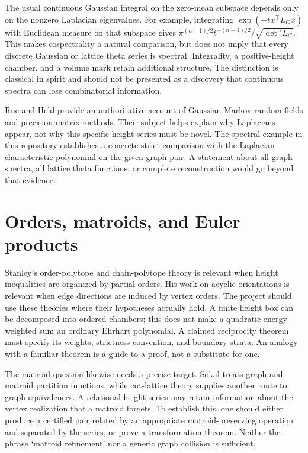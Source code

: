 \documentclass[
  11pt,
  a4paper,
]{report}
\begin{document}
The usual continuous Gaussian integral on the zero-mean subspace depends
only on the nonzero Laplacian eigenvalues. For example, integrating
\(\exp(-t x^\top L_Gx)\) with Euclidean measure on that subspace gives
\(\pi^{(n-1)/2}t^{-(n-1)/2}/\sqrt{\det' L_G}\). This makes cospectrality
a natural comparison, but does not imply that every discrete Gaussian or
lattice theta series is spectral. Integrality, a positive-height
chamber, and a volume mark retain additional structure. The distinction
is classical in spirit and should not be presented as a discovery that
continuous spectra can lose combinatorial information.

Rue and Held provide an authoritative account of Gaussian Markov random
fields and precision-matrix methods. Their subject helps explain why
Laplacians appear, not why this specific height series must be novel.
The spectral example in this repository establishes a concrete strict
comparison with the Laplacian characteristic polynomial on the given
graph pair. A statement about all graph spectra, all lattice theta
functions, or complete reconstruction would go beyond that evidence.

\hypertarget{orders-matroids-and-euler-products}{%
\section{Orders, matroids, and Euler
products}\label{orders-matroids-and-euler-products}}

Stanley's order-polytope and chain-polytope theory is relevant when
height inequalities are organized by partial orders. His work on acyclic
orientations is relevant when edge directions are induced by vertex
orders. The project should use these theories where their hypotheses
actually hold. A finite height box can be decomposed into ordered
chambers; this does not make a quadratic-energy weighted sum an ordinary
Ehrhart polynomial. A claimed reciprocity theorem must specify its
weights, strictness convention, and boundary strata. An analogy with a
familiar theorem is a guide to a proof, not a substitute for one.

The matroid question likewise needs a precise target. Sokal treats graph
and matroid partition functions, while cut-lattice theory supplies
another route to graph equivalences. A relational height series may
retain information about the vertex realization that a matroid forgets.
To establish this, one should either produce a certified pair related by
an appropriate matroid-preserving operation and separated by the series,
or prove a transformation theorem. Neither the phrase `matroid
refinement' nor a generic graph collision is sufficient.
\end{document}
